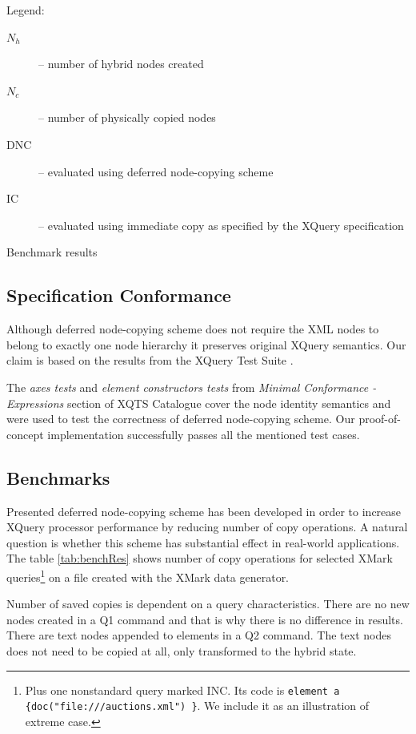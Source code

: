\documentclass{llncs}
\begin{document}
\begin{table}[ht]
\begin{center}
\end{center}
Legend:
\begin{description}
\item[$N_h$] -- number of hybrid nodes created
\item[$N_c$] -- number of physically copied nodes
\item[DNC] -- evaluated using deferred node-copying scheme
\item[IC] -- evaluated using immediate copy as specified by the XQuery specification
\end{description}
\begin{center}
\label{tab:benchRes}
\caption{Benchmark results}
\end{center}
\end{table}

\subsection{Specification Conformance}

Although deferred node-copying scheme does not require the XML nodes to
belong to exactly one node hierarchy it preserves original XQuery semantics.
Our claim is based on the results from the XQuery Test Suite \cite{XTS}.

The \textit{axes tests} and \textit{element constructors tests} from 
\textit{Minimal Conformance - Expressions} section of XQTS Catalogue
cover the node identity semantics and were used to test the correctness
of deferred node-copying scheme. Our proof-of-concept implementation
successfully passes all the mentioned test cases.


\subsection{Benchmarks}

Presented deferred node-copying scheme has been developed 
in order to increase XQuery processor performance by reducing number 
of copy operations. 
A natural question is whether this scheme has substantial effect in
real-world applications. The table \ref{tab:benchRes} shows number of copy 
operations for selected XMark \cite{Schmidt02a} queries\footnote{Plus one 
nonstandard query marked INC. Its code
is \texttt{element a \{doc("file:///auctions.xml") \}}. We include it as an
illustration of extreme case.} on a file created with 
the XMark data generator.



Number of saved copies is dependent on a query characteristics. There are no new
nodes created in a Q1 command and that is why there is no difference in results.
There are text nodes appended to elements in a Q2 command. The text nodes does 
not need to be copied at all, only transformed to the hybrid state.
\end{document}
